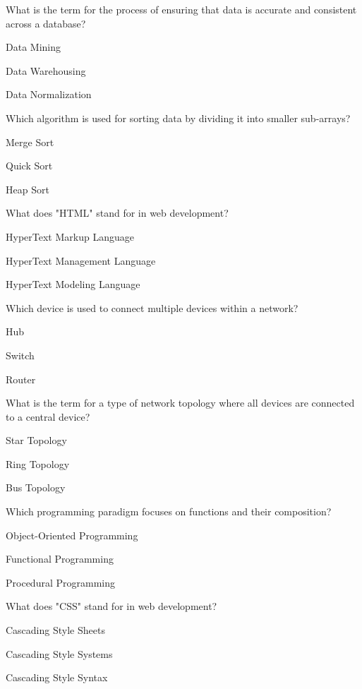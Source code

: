 \begin{enhancedmcq}{What is the term for the process of ensuring that data is accurate and consistent across a database?}
\item Data Mining
\item Data Warehousing
\item Data Normalization

\end{enhancedmcq}
\begin{enhancedmcq}{Which algorithm is used for sorting data by dividing it into smaller sub-arrays?}
\item Merge Sort
\item Quick Sort
\item Heap Sort

\end{enhancedmcq}
\begin{enhancedmcq}{What does "HTML" stand for in web development?}
\item HyperText Markup Language
\item HyperText Management Language
\item HyperText Modeling Language

\end{enhancedmcq}
\begin{enhancedmcq}{Which device is used to connect multiple devices within a network?}
\item Hub
\item Switch
\item Router

\end{enhancedmcq}
\begin{enhancedmcq}{What is the term for a type of network topology where all devices are connected to a central device?}
\item Star Topology
\item Ring Topology
\item Bus Topology

\end{enhancedmcq}
\begin{enhancedmcq}{Which programming paradigm focuses on functions and their composition?}
\item Object-Oriented Programming
\item Functional Programming
\item Procedural Programming

\end{enhancedmcq}
\begin{enhancedmcq}{What does "CSS" stand for in web development?}
\item Cascading Style Sheets
\item Cascading Style Systems
\item Cascading Style Syntax

\end{enhancedmcq}
